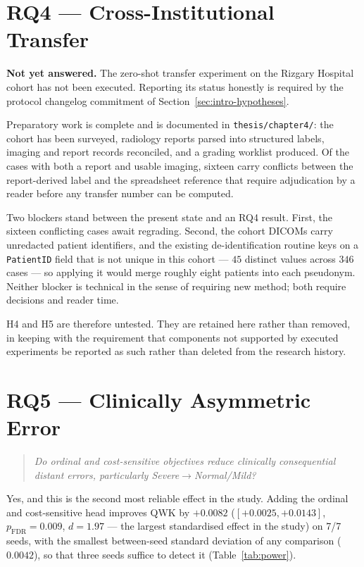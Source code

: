 \documentclass[12pt,a4paper]{report}
\begin{document}
\section{RQ4 --- Cross-Institutional Transfer}
\label{sec:results-rq4}

\textbf{Not yet answered.} The zero-shot transfer experiment on the Rizgary
Hospital cohort has not been executed. Reporting its status honestly is required
by the protocol changelog commitment of
Section~\ref{sec:intro-hypotheses}.

Preparatory work is complete and is documented in
\texttt{thesis/chapter4/}: the cohort has been surveyed, radiology reports parsed
into structured labels, imaging and report records reconciled, and a grading
worklist produced. Of the cases with both a report and usable imaging, sixteen
carry conflicts between the report-derived label and the spreadsheet reference
that require adjudication by a reader before any transfer number can be
computed.

Two blockers stand between the present state and an RQ4 result. First, the
sixteen conflicting cases await regrading. Second, the cohort DICOMs carry
unredacted patient identifiers, and the existing de-identification routine keys
on a \texttt{PatientID} field that is not unique in this cohort --- $45$ distinct
values across $346$ cases --- so applying it would merge roughly eight patients
into each pseudonym. Neither blocker is technical in the sense of requiring new
method; both require decisions and reader time.

H4 and H5 are therefore untested. They are retained here rather than removed, in
keeping with the requirement that components not supported by executed
experiments be reported as such rather than deleted from the research history.

\section{RQ5 --- Clinically Asymmetric Error}
\label{sec:results-rq5}

\begin{quote}
\emph{Do ordinal and cost-sensitive objectives reduce clinically consequential
distant errors, particularly Severe$\rightarrow$Normal/Mild?}
\end{quote}

Yes, and this is the second most reliable effect in the study. Adding the ordinal
and cost-sensitive head improves QWK by $+0.0082$ ($[+0.0025, +0.0143]$,
$p_{\mathrm{FDR}} = 0.009$, $d = 1.97$ --- the largest standardised effect in the
study) on 7/7
seeds, with the smallest between-seed standard deviation of any comparison
($0.0042$), so that three seeds suffice to detect it
(Table~\ref{tab:power}).
\end{document}
